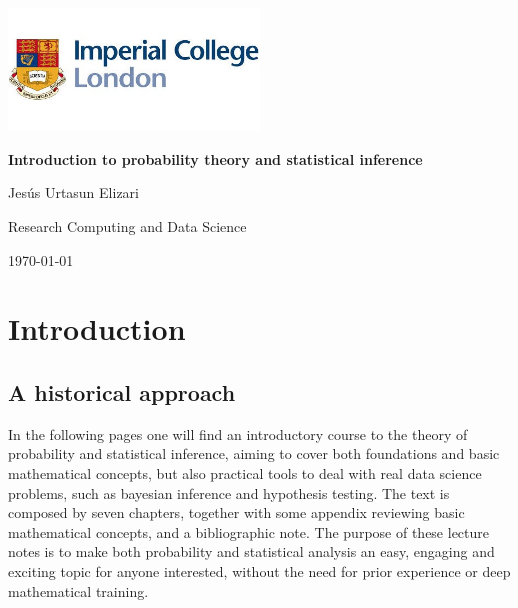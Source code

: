 \documentclass{book}
\begin{document}

\frontmatter

\begin{titlepage}
    \centering
    \includegraphics[width=0.5\textwidth]{figures/icl_logo.jpeg} 
    \vfill
    {\Huge\bfseries Introduction to probability theory and statistical inference\par}
    \vspace{1cm}
    {\Large Jes\'us Urtasun Elizari\par}
    \vspace{1cm}
     {\Large Research Computing and Data Science\par}
    \vspace{1cm}
    {\large\today\par}
    \vspace*{\fill}
\end{titlepage}

\tableofcontents

\clearpage
\printindex

\mainmatter


\chapter{Introduction}

\section{A historical approach}

In the following pages one will find an introductory course to the theory of probability and statistical inference, aiming to cover both foundations and basic mathematical concepts, but also practical tools to deal with real data science problems, such as bayesian inference and hypothesis testing. The text is composed by seven chapters, together with some appendix reviewing basic mathematical concepts, and a bibliographic note. The purpose of these lecture notes is to make both probability and statistical analysis an easy, engaging and exciting topic for anyone interested, without the need for prior experience or deep mathematical training.\\
\end{document}
